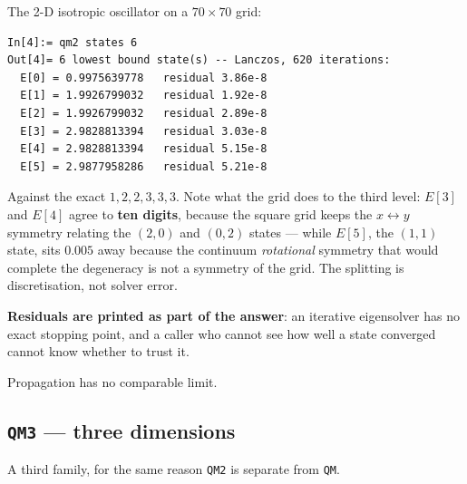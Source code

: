 \documentclass[11pt]{article}
\newcommand{\kw}[1]{\texttt{\uppercase{#1}}}
\begin{document}
The 2-D isotropic oscillator on a $70\times70$ grid:

\begin{lstlisting}
In[4]:= qm2 states 6
Out[4]= 6 lowest bound state(s) -- Lanczos, 620 iterations:
  E[0] = 0.9975639778   residual 3.86e-8
  E[1] = 1.9926799032   residual 1.92e-8
  E[2] = 1.9926799032   residual 2.89e-8
  E[3] = 2.9828813394   residual 3.03e-8
  E[4] = 2.9828813394   residual 5.15e-8
  E[5] = 2.9877958286   residual 5.21e-8
\end{lstlisting}

Against the exact $1,2,2,3,3,3$. Note what the grid does to the third
level: $E[3]$ and $E[4]$ agree to \textbf{ten digits}, because the square
grid keeps the $x\leftrightarrow y$ symmetry relating the $(2,0)$ and
$(0,2)$ states --- while $E[5]$, the $(1,1)$ state, sits $0.005$ away
because the continuum \emph{rotational} symmetry that would complete the
degeneracy is not a symmetry of the grid. The splitting is
discretisation, not solver error.

\textbf{Residuals are printed as part of the answer}: an iterative
eigensolver has no exact stopping point, and a caller who cannot see how
well a state converged cannot know whether to trust it.

Propagation has no comparable limit.

\subsection{\kw{qm3} --- three dimensions}\label{sec:qm3}

A third family, for the same reason \kw{qm2} is separate from \kw{qm}.
\end{document}
